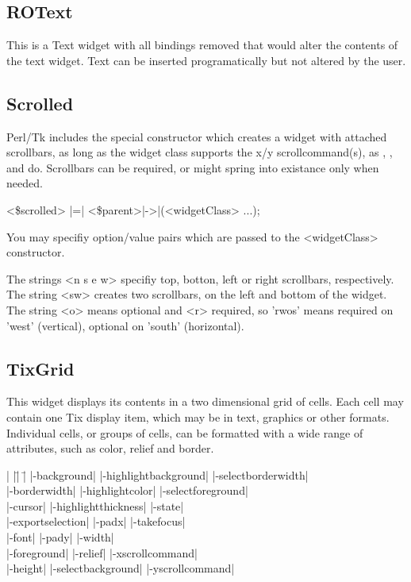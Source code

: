 \subsection*{ROText}
This is a  Text widget with all bindings removed that would
alter the contents of the text widget.  Text can be inserted
programatically but not altered by the user.

\subsection*{Scrolled}
Perl/Tk includes the special constructor  which
creates a widget with attached scrollbars, as long as the widget class
supports the x/y scrollcommand(s), as ,
,  and  do.  Scrollbars can be required, or might
spring into existance only when needed.

\quad \quad <\$scrolled> |=| <\$parent>|->|(<widgetClass> ...);

You may specifiy option/value pairs which are passed to the <widgetClass>
constructor.

\vskip5pt
\begin{enum}{1cm}

The strings <n s e w> specifiy top, botton, left or right scrollbars,
respectively.  The string <sw> creates two scrollbars, on the left and bottom of
the widget.  The string <o> means optional and <r> required, so
'rwos' means required on 'west' (vertical), optional on 'south' (horizontal).

\end{enum}

\subsection*{TixGrid}
This widget displays its contents in a two dimensional
grid of cells.  Each cell may contain one Tix display
item, which may be in text, graphics or other formats.
Individual cells, or groups of cells,
can be formatted with a wide range of attributes, such as color,
relief and border.
\vskip5pt
\vspace{-4pt}

\begin{tabbing}
|                    |\=|                      |\= \kill                    
|-background|        \> |-highlightbackground|  \> |-selectborderwidth| \\
|-borderwidth|       \> |-highlightcolor|       \> |-selectforeground| \\
|-cursor|	     \> |-highlightthickness|   \> |-state| \\         
|-exportselection|   \> |-padx|                 \> |-takefocus| \\
|-font|              \> |-pady|                 \> |-width| \\           
|-foreground|        \> |-relief|               \> |-xscrollcommand| \\  
|-height|            \> |-selectbackground|     \> |-yscrollcommand| \\  
\end{tabbing}

